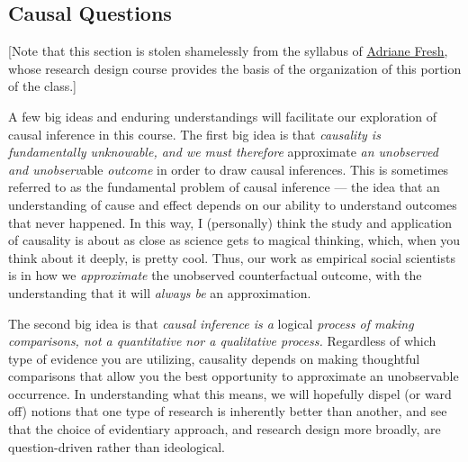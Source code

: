 \documentclass[12pt]{article}
\begin{document}
\subsection{Causal Questions}

[Note that this section is stolen shamelessly from the syllabus of \href{http://www.adrianefresh.com}{\underline{Adriane Fresh}}, whose research design course provides the basis of the organization of this portion of the class.]

A few big ideas and enduring understandings will facilitate our exploration of causal inference in this course.  The first big idea is that \emph{causality is fundamentally unknowable, and we must therefore} approximate \emph{an unobserved and unobserv}able \emph{outcome} in order to draw causal inferences.  This is sometimes referred to as the fundamental problem of causal inference --- the idea that an understanding of cause and effect depends on our ability to understand outcomes that never happened.  In this way, I (personally) think the study and application of causality is about as close as science gets to magical thinking, which, when you think about it deeply, is pretty cool.  Thus, our work as empirical social scientists is in how we \emph{approximate} the unobserved counterfactual outcome, with the understanding that it will \emph{always be} an approximation.

The second big idea is that \emph{causal inference is a} logical \emph{process of making comparisons, not a quantitative nor a qualitative process.}  Regardless of which type of evidence you are utilizing, causality depends on making thoughtful comparisons that allow you the best opportunity to approximate an unobservable occurrence.  In understanding what this means, we will hopefully dispel (or ward off) notions that one type of research is inherently better than another, and see that the choice of evidentiary approach, and research design more broadly, are question-driven rather than ideological.
\end{document}
